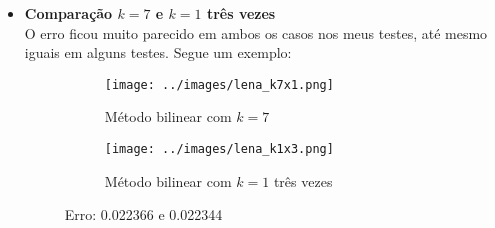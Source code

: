 \documentclass[leqno]{article}
\begin{document}
\begin{itemize}
    \item \textbf{Comparação $k = 7$ e $k = 1$ três vezes} \\
        O erro ficou muito parecido em ambos os casos nos meus testes, até mesmo
        iguais em alguns testes. Segue um exemplo:

      \begin{figure}[H]
          \centering
          \begin{subfigure}{.45\textwidth}
            \centering
            \texttt{[image: ../images/lena\_k7x1.png]}
            \caption{Método bilinear com $k = 7$}
            \label{fig:sub2}
          \end{subfigure}
          \begin{subfigure}{.45\textwidth}
              \centering
              \texttt{[image: ../images/lena\_k1x3.png]}
              \caption{Método bilinear com $k = 1$ três vezes}
              \label{fig:sub1}
            \end{subfigure}%
          \caption{Erro: 0.022366 e 0.022344}
          \label{fig:test}
      \end{figure}
\end{itemize}
\end{document}
